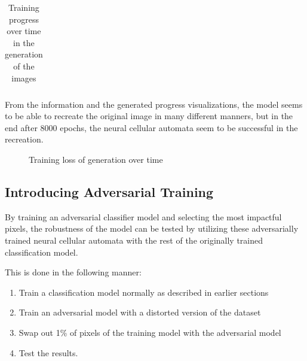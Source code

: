 \documentclass[conference]{IEEEtran}
\begin{document}
\begin{table}[ht]
\begin{tabular}{cc}
\end{tabular}
\caption{Training progress over time in the generation of the images}
\end{table}

From the information and the generated progress visualizations, the model seems to be able to recreate the original image in many different manners, but in the end after 8000 epochs, the neural cellular automata seem to be successful in the recreation.

\begin{figure}[htbp]
\caption{Training loss of generation over time}
\end{figure}

\subsection{Introducing Adversarial Training}

By training an adversarial classifier model and selecting the most impactful pixels, the robustness of the model can be tested by utilizing these adversarially trained neural cellular automata with the rest of the originally trained classification model. 

This is done in the following manner:
\begin{enumerate}
    \item Train a classification model normally as described in earlier sections
    \item Train an adversarial model with a distorted version of the dataset
    \item Swap out 1\% of pixels of the training model with the adversarial model
    \item Test the results.
\end{enumerate}
\end{document}
